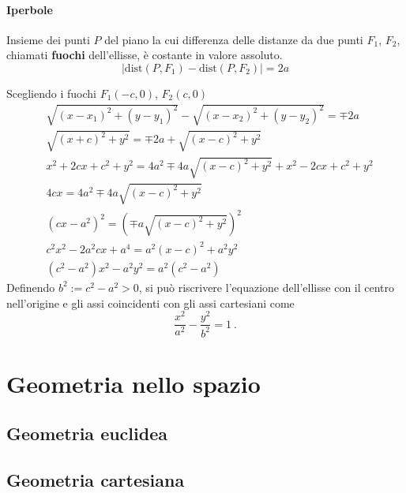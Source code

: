 \subsubsection{Iperbole}
\begin{definition}[Iperbole] Insieme dei punti $P$ del piano la cui differenza delle distanze da due punti $F_1$, $F_2$, chiamati \textbf{fuochi} dell'ellisse, è costante in valore assoluto.
    \begin{equation}
       | \text{dist}(P, F_1) - \text{dist}(P, F_2) | = 2a
    \end{equation}
\end{definition}
Scegliendo i fuochi $F_1(-c,0)$, $F_2(c,0)$
\begin{equation}
\begin{aligned}
    & \sqrt{( x - x_1 )^2 + (y-y_1)^2} - \sqrt{(x-x_2)^2 + (y-y_2)^2} = \mp 2a \\
    & \sqrt{( x + c )^2 + y^2} = \mp 2a + \sqrt{(x-c)^2 + y^2} \\
    & x^2 + 2 c x + c^2 + y^2  = 4a^2 \mp 4 a \sqrt{(x-c)^2 + y^2} +
    x^2 - 2 c x + c^2 + y^2 \\
    & 4c x = 4a^2 \mp 4a  \sqrt{(x-c)^2 + y^2} \\
    & (cx - a^2)^2 = ( \mp a  \sqrt{(x-c)^2 + y^2})^2 \\
    & c^2x^2 - 2a^2cx + a^4 = a^2(x-c)^2 + a^2 y^2 \\
    & (c^2-a^2) x^2 - a^2y^2 = a^2 (c^2-a^2) 
\end{aligned}
\end{equation}
Definendo $b^2 := c^2 - a^2 > 0$, si può riscrivere l'equazione dell'ellisse con il centro nell'origine e gli assi coincidenti con gli assi cartesiani come
\begin{equation}
  \dfrac{x^2}{a^2} - \dfrac{y^2}{b^2} = 1 \ .
\end{equation}


\chapter{Geometria nello spazio}
\section{Geometria euclidea}
\section{Geometria cartesiana}

